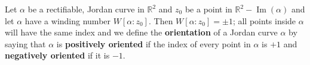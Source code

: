 \documentclass[12pt]{article}
\begin{document}
Let $\alpha$ be a rectifiable, Jordan curve in $\mathbb{R}^{2}$ and $z_{0}$ be a point in $\mathbb{R}^{2} - \operatorname{Im}(\alpha)$ and let $\alpha$ have a winding number $W [ \alpha : z_{0} ]$. Then $W [ \alpha : z_{0} ] = \pm 1$; all points inside $\alpha$ will have the same index and we define the \textbf{orientation} of a Jordan curve $\alpha$ by saying that $\alpha$ is \textbf{positively oriented} if the index of every point in $\alpha$ is $+1$ and \textbf{negatively oriented} if it is $-1$.
\end{document}
